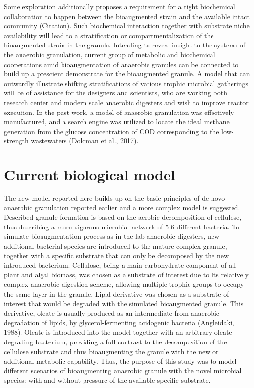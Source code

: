 Some exploration additionally proposes a requirement for a tight biochemical collaboration to happen between the bioaugmented strain and the available intact community (Citation). Such biochemical interaction together with substrate niche availability will lead to a stratification or compartmentalization of the bioaugmented strain in the granule. Intending to reveal insight to the systems of the anaerobic granulation, current group of metabolic and biochemical cooperations amid bioaugmentation of anaerobic granules can be connected to build up a prescient demonstrate for the bioaugmented granule. A model that can outwardly illustrate shifting stratifications of various trophic microbial gatherings will be of assistance for the designers and scientists, who are working both research center and modern scale anaerobic digesters and wish to improve reactor execution. In the past work, a model of anaerobic granulation was effectively manufactured, and a search engine was utilized to locate the ideal methane generation from the glucose concentration of COD corresponding to the low-strength wastewaters (Doloman et al., 2017). 

\section{Current biological model}

The new model reported here builds up on the basic principles of de novo anaerobic granulation reported earlier and a more complex model is suggested. Described granule formation is based on the aerobic decomposition of cellulose, thus describing a more vigorous microbial network of 5-6 different bacteria. To simulate bioaugmentation process as in the lab anaerobic digesters, new additional bacterial species are introduced to the mature complex granule, together with a specific substrate that can only be decomposed by the new introduced bacterium. Cellulose, being a main carbohydrate component of all plant and algal biomass, was chosen as a substrate of interest due to its relatively complex anaerobic digestion scheme, allowing multiple trophic groups to occupy the same layer in the granule. Lipid derivative was chosen as a substrate of interest that would be degraded with the simulated bioaugmented granule. This derivative, oleate is usually produced as an intermediate from anaerobic degradation of lipids, by glycerol-fermenting acidogenic bacteria (Angleidaki, 1988). Oleate is introduced into the model together with an arbitrary oleate degrading bacterium, providing a full contrast to the decomposition of the cellulose substrate and thus bioaugmenting the granule with the new or additional metabolic capability. Thus, the purpose of this study was to model different scenarios of bioaugmenting anaerobic granule with the novel microbial species: with and without pressure of the available specific substrate.

